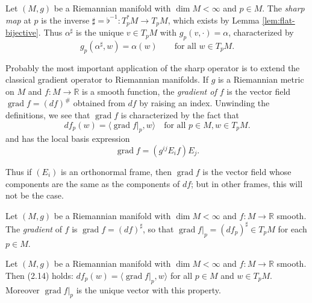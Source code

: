 \begin{definition}
\label{def:sharp-map}
\leanok
{}
Let $(M,g)$ be a Riemannian manifold with $\dim M < \infty$ and $p \in M$. The \emph{sharp map} at $p$ is the inverse $\sharp = \flat^{-1} : T_p^* M \to T_p M$, which exists by Lemma \ref{lem:flat-bijective}. Thus $\alpha^\sharp$ is the unique $v \in T_p M$ with $g_p(v,\cdot) = \alpha$, characterized by
\[
g_p(\alpha^\sharp, w) = \alpha(w) \qquad \text{for all } w \in T_p M .
\]
\end{definition}

Probably the most important application of the sharp operator is to extend the classical gradient operator to Riemannian manifolds. If $g$ is a Riemannian metric on $M$ and $f : M \to \mathbb{R}$ is a smooth function, the \emph{gradient of $f$} is the vector field
$\operatorname{grad} f = (df)^\#$ obtained from $df$ by raising an index. Unwinding the definitions,
we see that $\operatorname{grad} f$ is characterized by the fact that
\begin{equation}
df_p(w) = \langle \operatorname{grad} f|_p, w \rangle \quad \text{for all } p \in M, w \in T_p M.
\tag{2.14}
\end{equation}
and has the local basis expression
\[
\operatorname{grad} f = (g^{ij} E_i f) E_j.
\]

Thus if $(E_i)$ is an orthonormal frame, then $\operatorname{grad} f$ is the vector field whose
components are the same as the components of $df$; but in other frames, this will
not be the case.

\begin{definition}
\label{def:gradient}
\leanok
{}
Let $(M,g)$ be a Riemannian manifold with $\dim M < \infty$ and $f : M \to \mathbb{R}$ smooth. The \emph{gradient} of $f$ is $\operatorname{grad} f = (df)^\sharp$, so that $\operatorname{grad} f|_p = (df_p)^\sharp \in T_p M$ for each $p \in M$.
\end{definition}

\begin{lemma}
\label{lem:gradient-characterization}
\leanok
{}
Let $(M,g)$ be a Riemannian manifold with $\dim M < \infty$ and $f : M \to \mathbb{R}$ smooth. Then (2.14) holds: $df_p(w) = \langle \operatorname{grad} f|_p, w\rangle$ for all $p \in M$ and $w \in T_p M$. Moreover $\operatorname{grad} f|_p$ is the unique vector with this property.
\end{lemma}

